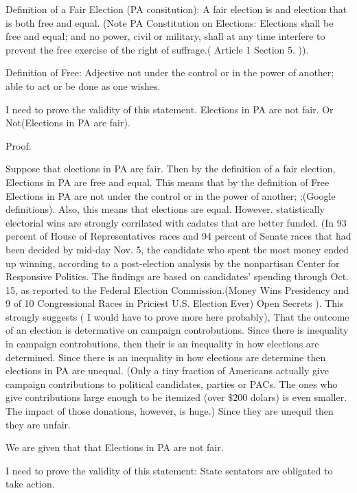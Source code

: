 \documentclass[11pt]{article} %
\begin{document}
\begin{enumerate}
Definition of a Fair Election (PA consitution):  A fair election is and election that is both free and equal.   (Note PA Constitution on Elections: Elections shall be free and equal; and no power, civil or military, shall at any time interfere to prevent the free exercise of the right of suffrage.( Article 1 Section 5. )). 

Definition of Free: Adjective not under the control or in the power of another; able to act or be done as one wishes.

I need to prove the validity of this statement.  Elections in PA are not fair. Or Not(Elections in PA are fair).

Proof: 
%

Suppose that elections in PA are fair. Then  by the definition of a fair election, Elections in PA are free and equal. This means that by the definition of Free Elections in PA are not under the control or in the power of another; ;(Google definitions).   Also, this means that elections are equal.  However. statistically electorial wins are strongly corrilated with cadates that are better funded. (In 93 percent of House of Representatives races and 94 percent of Senate races that had been decided by mid-day Nov. 5, the candidate who spent the most money ended up winning, according to a post-election analysis by the nonpartisan Center for Responsive Politics. The findings are based on candidates' spending through Oct. 15, as reported to the Federal Election Commission.(Money Wins Presidency and 9 of 10 Congressional Races in Priciest U.S. Election Ever) Open Secrets ).  This strongly suggests ( I would have to prove more here probably), That the outcome of an election is determative on campaign controbutions.  Since there is inequality in campaign controbutions, then their is an inequality in how elections are determined. Since there is an inequality in how elections are determine then elections in PA are unequal.    (Only a tiny fraction of Americans actually give campaign contributions to political candidates, parties or PACs. The ones who give contributions large enough to be itemized (over $\$200$ dolars) is even smaller. The impact of those donations, however, is huge.)  Since they are unequil then they are unfair. 




We are given that that Elections in PA are not fair. 

I need to prove the validity of this statement: State sentators are obligated to take action. 


\end{enumerate}
\end{document}
